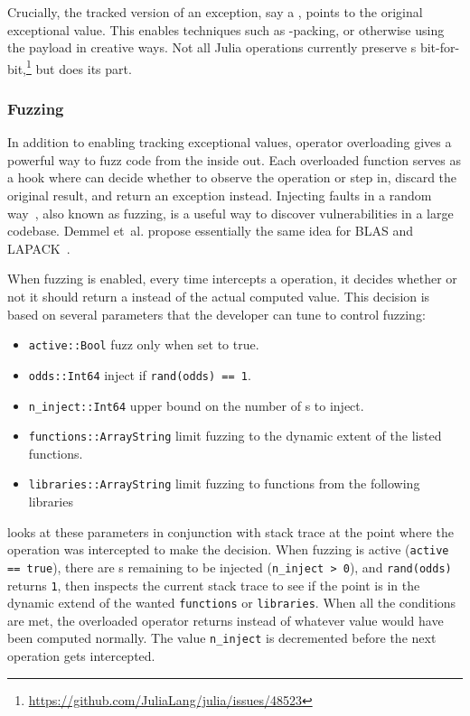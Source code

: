 \documentclass{juliacon}
\begin{document}
Crucially, the tracked version of an exception, say a \NaN{}, points
to the original exceptional value.
This enables techniques such as \NaN{}-packing, or otherwise
using the payload in creative ways.
Not all Julia operations currently preserve \NaN{}s
bit-for-bit,\footnote{\url{https://github.com/JuliaLang/julia/issues/48523}}
but \TF{} does its part.


\subsubsection{Fuzzing}

In addition to enabling tracking exceptional values, operator
overloading gives \TF{} a powerful way to fuzz code from the inside
out.
Each overloaded function serves as a hook where \TF{} can decide whether to observe
the operation or step in, discard the original result, and return an exception instead.
Injecting faults in a random way~\cite{hamlet1994random}, also known as fuzzing,
is a useful way to discover vulnerabilities in a large codebase.
Demmel et~al. propose essentially the same idea for BLAS and
LAPACK~\cite{ddghlllprr-correctness-2022}.

When fuzzing is enabled, every time \TF{} intercepts a \fp{}
operation, it decides whether or not it should return a \Nan{} instead
of the actual computed value.
This decision is based on several parameters that the developer can
tune to control fuzzing:

\begin{itemize}
\item \texttt{active::Bool} fuzz only when set to true.
\item \texttt{odds::Int64} inject if \texttt{rand(odds) == 1}.
\item \texttt{n\_inject::Int64} upper bound on the number of \Nan{}s to inject.
\item \texttt{functions::Array{String}} limit fuzzing to the dynamic extent of the listed functions.
\item \texttt{libraries::Array{String}} limit fuzzing to functions from the following libraries
\end{itemize}

\TF{} looks at these parameters in conjunction with stack trace at the
point where the operation was intercepted to make the decision.
When fuzzing is active (\texttt{active == true}), there are \Nan{}s
remaining to be injected (\texttt{n\_inject > 0}), and
\texttt{rand(odds)} returns \texttt{1}, then \TF{} inspects the
current stack trace to see if the point is in the dynamic extend of
the wanted \texttt{functions} or \texttt{libraries}.
When all the conditions are met, the overloaded operator returns
\Nan{} instead of whatever value would have been computed normally.
The value \texttt{n\_inject} is decremented before the next operation
gets intercepted.
\end{document}
